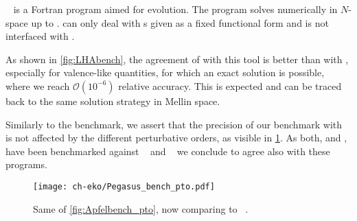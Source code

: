 \pegasus{}~\cite{Vogt:2004ns} is a Fortran program aimed for \pdf{} evolution.
The program solves \dglap{} numerically in $N$-space up to \nnlo{}.
\pegasus{} can only deal with \pdf{}s given as a fixed functional form and is
not interfaced with \lhapdf{}.

As shown in \cref{fig:LHAbench}, the agreement of \eko{} with this tool is better than with \apfel{},
especially for valence-like quantities, for which an exact solution is possible, where we reach
$\mathcal{O}(10^{-6})$ relative accuracy.
This is expected and can be traced back to the same \dglap{} solution strategy in Mellin space.

Similarly to the \apfel{} benchmark, we assert that the precision of our benchmark with \pegasus{} is not affected
by the different \qcd{} perturbative orders, as visible in \cref{fig:Pegasusbench_pto}.
As both, \apfel{} and \pegasus{}, have been benchmarked against
\hoppet{}~\cite{Salam:2008qg} and \qcdnum{}~\cite{Botje:2010ay} we conclude
to agree also with these programs.

\begin{figure}
    \texttt{[image: ch-eko/Pegasus\_bench\_pto.pdf]}
    \caption{Same of \cref{fig:Apfelbench_pto}, now comparing to \pegasus{}~\cite{Vogt:2004ns}.
        \label{fig:Pegasusbench_pto} }
\end{figure}

